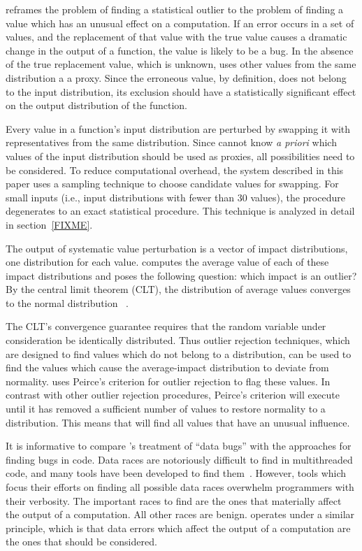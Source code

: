 \checkcell reframes the problem of finding a statistical outlier to the problem of finding a value which has an unusual effect on a computation.  If an error occurs in a set of values, and the replacement of that value with the true value causes a dramatic change in the output of a function, the value is likely to be a bug.  In the absence of the true replacement value, which is unknown, \checkcell uses other values from the same distribution a a proxy.  Since the erroneous value, by definition, does not belong to the input distribution, its exclusion should have a statistically significant effect on the output distribution of the function.

Every value in a function's input distribution are perturbed by swapping it with representatives from the same distribution.  Since \checkcell cannot know \emph{a priori} which values of the input distribution should be used as proxies, all possibilities need to be considered.  To reduce computational overhead, the system described in this paper uses a sampling technique to choose candidate values for swapping.  For small inputs (i.e., input distributions with fewer than 30 values), the procedure degenerates to an exact statistical procedure.  This technique is analyzed in detail in section~\ref{FIXME}.

The output of systematic value perturbation is a vector of impact distributions, one distribution for each value.  \checkcell computes the average value of each of these impact distributions and poses the following question: which impact is an outlier?  By the central limit theorem (CLT), the distribution of average values converges to the normal distribution ~\cite{FIXME}.

The CLT's convergence guarantee requires that the random variable under consideration be identically distributed.  Thus outlier rejection techniques, which are designed to find values which do not belong to a distribution, can be used to find the values which cause the average-impact distribution to deviate from normality.  \checkcell uses Peirce's criterion for outlier rejection to flag these values.  In contrast with other outlier rejection procedures, Peirce's criterion will execute until it has removed a sufficient number of values to restore normality to a distribution.  This means that \checkcell will find all values that have an unusual influence.

It is informative to compare \checkcell's treatment of ``data bugs'' with the approaches for finding bugs in code.  Data races are notoriously difficult to find in multithreaded code, and many tools have been developed to find them~\cite{FIXME}.  However, tools which focus their efforts on finding all possible data races overwhelm programmers with their verbosity.  The important races to find are the ones that materially affect the output of a computation.  All other races are benign.  \checkcell operates under a similar principle, which is that data errors which affect the output of a computation are the ones that should be considered.